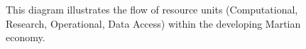 \documentclass[fontsize=10pt, oneside, DIV=calc]{scrartcl}
\begin{document}
\medskip

\noindent


\begin{figure}[H]
  \centering
  \noindent
  \begin{minipage}{\textwidth}
    \centering
    \caption{This diagram illustrates the flow of resource units (Computational, Research, Operational, Data Access) within the developing Martian economy.}
  \end{minipage}
\end{figure}

\begin{comment}
@startuml
!theme materia-outline
scale 1.6

skinparam defaultFontColor black
skinparam backgroundColor white


scale 1.6

skinparam defaultFontColor black
skinparam backgroundColor white



title ``Martian Economy:\nResource Unit Flow''

skinparam rectangle {
  BorderColor black
  FontColor black
  shadowing 0
  FontSize 10
}
skinparam component {
  BorderColor black
  FontColor black
  shadowing 0
  FontSize 12
}
skinparam arrow {
  Color black
}

component ``Colossus AI\n(CU Source)'' as Colossus
component ``Sci/Research\n(DU Source)'' as Science
component ``Workforce\n(OU Source)'' as Workforce
component ``Data Sources\n(DAU Source)'' as DataSources

rectangle ``Comp. Units\n(CU)'' as CU
rectangle ``Disc. Units\n(DU)'' as DU
rectangle ``Oper. Units\n(OU)'' as OU
rectangle ``Data Access\nUnits (DAU)'' as DAU

component ``Martian\nEconomy'' as Economy

component ``Earth\nClients'' as EarthClients
component ``ISRU/\nMfg'' as ISRUMfg
component ``Interplanetary\nExpansion'' as Expansion


Colossus --> CU : ``Generates''
Science --> DU : ``Generates''
Workforce --> OU : ``Generates''
DataSources --> DAU : ``Generates''

CU --> Economy : ``Flows to''
DU --> Economy : ``Flows to''
OU --> Economy : ``Flows to''
DAU --> Economy : ``Flows to''

Economy --> EarthClients : ``CUs\n(External Value)''
Economy --> ISRUMfg : ``OUs\n(Internal Use)''
Economy --> Expansion : ``Fuels''

ISRUMfg --> Economy : ``Materials/\nFeedstock''

note right of Economy
  Internal Exchange
  Trade
  Allocation
end note

@enduml
\end{comment}
\end{document}
